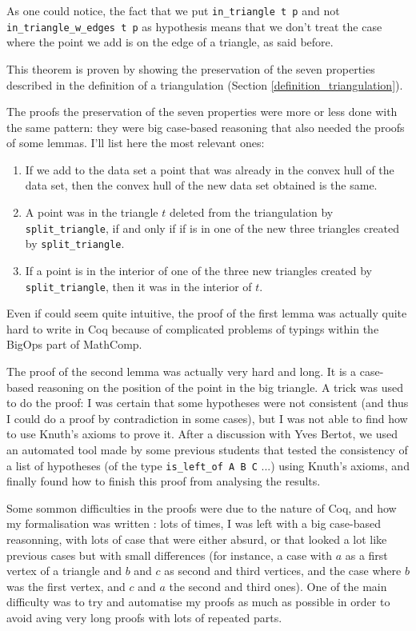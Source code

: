 \documentclass[a4paper,10pt]{article}
\begin{document}
As one could notice, the fact that we put {\tt in\_triangle t p} and not {\tt in\_triangle\_w\_edges t p} as hypothesis means that we don't treat the case where the point we add is on the edge of a triangle, as said before. 

This theorem is proven by showing the preservation of the seven properties described in the definition of a triangulation (Section \ref{definition_triangulation}).

The proofs the preservation of the seven properties were more or less done with the same pattern: they were big case-based reasoning that also needed the proofs of some lemmas. I'll list here the most relevant ones:
\begin{enumerate}
\item If we add to the data set a point that was already in the convex hull of the data set, then the convex hull of the new data set obtained is the same.
\item A point was in the triangle $t$ deleted from the triangulation by {\tt split\_triangle}, if and only if if is in one of the new three triangles created by {\tt split\_triangle}.
\item If a point is in the interior of one of the three new triangles created by {\tt split\_triangle}, then it was in the interior of $t$.
\end{enumerate}

Even if could seem quite intuitive, the proof of the first lemma was actually quite hard to write in {\sc Coq} because of complicated problems of typings within the BigOps part of {\sc MathComp}.

The proof of the second lemma was actually very hard and long. It is a case-based reasoning on the position of the point in the big triangle. A trick was used to do the proof: I was certain that some hypotheses were not consistent (and thus I could do a proof by contradiction in some cases), but I was not able to find how to use Knuth's axioms to prove it. After a discussion with Yves Bertot, we used an automated tool made by some previous students that tested the consistency of a list of hypotheses (of the type {\tt is\_left\_of A B C} ...) using Knuth's axioms, and finally found how to finish this proof from analysing the results.

Some sommon difficulties in the proofs were due to the nature of {\sc Coq}, and how my formalisation was written : lots of times, I was left with a big case-based reasonning, with lots of case that were either absurd, or that looked a lot like previous cases but with small differences (for instance, a case with $a$ as a first vertex of a triangle and $b$ and $c$ as second and third vertices, and the case where $b$ was the first vertex, and $c$ and $a$ the second and third ones). One of the main difficulty was to try and automatise my proofs as much as possible in order to avoid aving very long proofs with lots of repeated parts.
\end{document}
